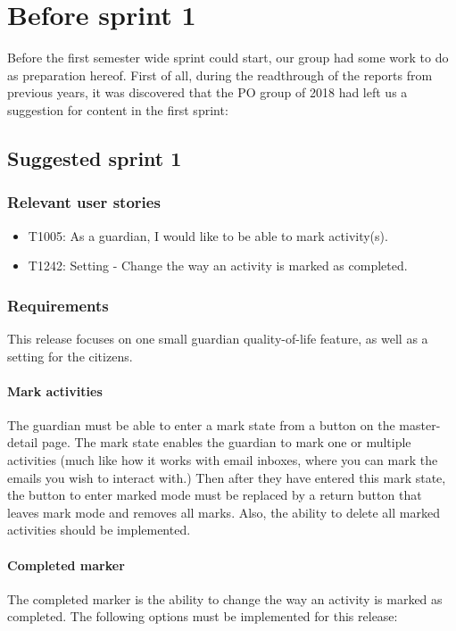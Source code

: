 \section{Before sprint 1}\label{before-sprint-1}
Before the first semester wide sprint could start, our group had some work to do as preparation hereof.
First of all, during the readthrough of the reports from previous years, it was discovered that the PO group of 2018 had left us a suggestion for content in the first sprint:

\subsection*{Suggested sprint 1}
\subsubsection*{Relevant user stories}
\begin{itemize}
    \item T1005: As a guardian, I would like to be able to mark activity(s). 
    \item T1242: Setting - Change the way an activity is marked as completed. 
\end{itemize}

\subsubsection{Requirements}
This release focuses on one small guardian quality-of-life feature, as well as a setting for the citizens.

\paragraph{Mark activities}
The guardian must be able to enter a mark state from a button on the master-detail page. The mark state enables the guardian to mark one or multiple activities (much like how it works with email inboxes, where you can mark the emails you wish to interact with.) Then after they have entered this mark state, the button to enter marked mode must be replaced by a return button that leaves mark mode and removes all marks. Also, the ability to delete all marked activities should be implemented.

\paragraph{Completed marker}
The completed marker is the ability to change the way an activity is marked as completed. The following options must be implemented for this release:


